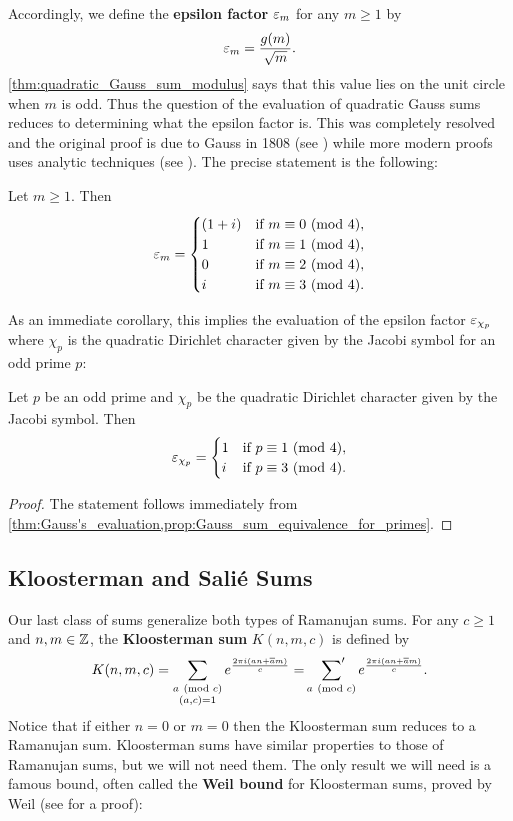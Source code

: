       Accordingly, we define the \textbf{epsilon factor} $\varepsilon_{m}$ for any $m \ge 1$ by
      \[
        \varepsilon_{m} = \frac{g(m)}{\sqrt{m}}.
      \]
      \cref{thm:quadratic_Gauss_sum_modulus} says that this value lies on the unit circle when $m$ is odd. Thus the question of the evaluation of quadratic Gauss sums reduces to determining what the epsilon factor is. This was completely resolved and the original proof is due to Gauss in 1808 (see \cite{Gauss1808summatio}) while more modern proofs uses analytic techniques (see \cite{lang1994algebraic}). The precise statement is the following:

      \begin{theorem}\label{thm:Gauss's_evaluation}
        Let $m \ge 1$. Then
        \[
          \varepsilon_{m} = \begin{cases} (1+i) & \text{if $m \equiv 0 \ (\mathrm{mod}\text{ }4)$}, \\ 1 & \text{if $m \equiv 1 \ (\mathrm{mod}\text{ }4)$}, \\ 0 & \text{if $m \equiv 2 \ (\mathrm{mod}\text{ }4)$}, \\ i & \text{if $m \equiv 3 \ (\mathrm{mod}\text{ }4)$}. \end{cases}
        \]
      \end{theorem}

      As an immediate corollary, this implies the evaluation of the epsilon factor $\varepsilon_{\chi_{p}}$ where $\chi_{p}$ is the quadratic Dirichlet character given by the Jacobi symbol for an odd prime $p$:

      \begin{corollary}
        Let $p$ be an odd prime and $\chi_{p}$ be the quadratic Dirichlet character given by the Jacobi symbol. Then
        \[
          \varepsilon_{\chi_{p}} = \begin{cases} 1 & \text{if $p \equiv 1 \ (\mathrm{mod}\text{ }4)$}, \\ i & \text{if $p \equiv 3 \ (\mathrm{mod}\text{ }4)$}. \end{cases}
        \]
      \end{corollary}
      \begin{proof}
        The statement follows immediately from \cref{thm:Gauss's_evaluation,prop:Gauss_sum_equivalence_for_primes}.
      \end{proof}
    \subsection*{Kloosterman and Sali\'e Sums}
      Our last class of sums generalize both types of Ramanujan sums. For any $c \ge 1$ and $n,m \in \mathbb{Z}$, the \textbf{Kloosterman sum} $K(n,m,c)$ is defined by
      \[
        K(n,m,c) = \sum_{\substack{a \ (\mathrm{mod}\text{ }c) \\ (a,c) = 1}}e^{\frac{2\pi i(an+\overline{a}m)}{c}} = \sideset{}{'}\sum_{a \ (\mathrm{mod}\text{ }c)}e^{\frac{2\pi i(an+\overline{a}m)}{c}}.
      \]
      Notice that if either $n = 0$ or $m = 0$ then the Kloosterman sum reduces to a Ramanujan sum. Kloosterman sums have similar properties to those of Ramanujan sums, but we will not need them. The only result we will need is a famous bound, often called the \textbf{Weil bound} for Kloosterman sums, proved by Weil (see \cite{weil1948some} for a proof):

